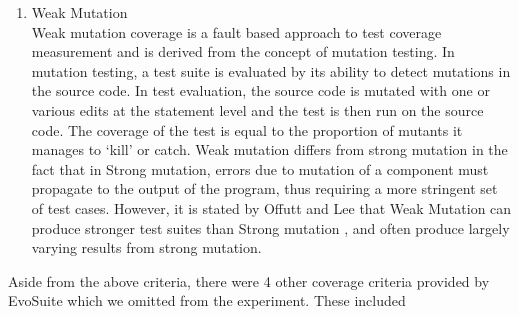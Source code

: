 \documentclass[titlepage]{article}
\begin{document}
\begin{enumerate}
	\item Weak Mutation \\
Weak mutation \cite{mutation1, mutation2} coverage is a fault based approach to test coverage measurement and is derived from the concept of mutation testing. In mutation testing, a test suite is evaluated by its ability to detect mutations in the source code. In test evaluation, the source code is mutated with one or various edits at the statement level and the test is then run on the source code. The coverage of the test is equal to the proportion of mutants it manages to ‘kill’ or catch. Weak mutation differs from strong mutation in the fact that in Strong mutation, errors due to mutation of a component must propagate to the output of the program, thus requiring a more stringent set of test cases. However, it is stated by Offutt and Lee that Weak Mutation can produce stronger test suites than Strong mutation \cite{strongweakmutation}, and often produce largely varying results from strong mutation.

\end{enumerate}	
Aside from the above criteria, there were 4 other coverage criteria provided by EvoSuite which we omitted from the experiment. These included 
\end{document}
